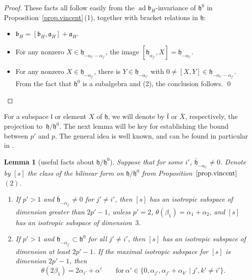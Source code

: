 \documentclass[pdftex]{sigma}
\numberwithin{equation}{section}
\newtheorem{lem}[thm]{Lemma}
\theoremstyle{definition}
\newcommand{\lieh}{\mathfrak{h}}
\def\a{{\mathfrak a}}
\def\b{{\mathfrak b}}
\newcommand{\ad}{\operatorname{ad}}
\begin{document}
\begin{proof}
These facts all follow easily from the $\ad \b_H$-invariance of $\lieh^0$ in Proposition~\ref{prop.vincent}\,(1), together with bracket relations in $\lieh$:
\begin{itemize}\itemsep=0pt
\item[(1)] $\b_H = [\b_H, \a_H] + \a_H$.
\item[(2)] For any nonzero $X \in \lieh_{- \alpha_{i'} - \alpha_{j'}}$, the image $[\lieh_{\alpha_{j'}},X] = \lieh_{-\alpha_{i'}}$.
\item[(3)] For any nonzero $X \in \lieh_{-\alpha_{j'}}$, there is $Y \in \lieh_{- \alpha_{i'}}$ with $0 \neq [X,Y] \in \lieh_{- \alpha_{i'}-\alpha_{j'}}$. From the fact that $\lieh^0$ is a subalgebra and (2), the conclusion follows.
\hfill\qed
\end{itemize}
\renewcommand{\qed}{}
\end{proof}

For a subspace $\mathfrak{l}$ or element $X$ of $\lieh$, we will denote by $\bar{\mathfrak{l}}$ or $\bar{X}$, respectively, the projection to~$\lieh/\lieh^0$.
The next lemma will be key for establishing the bound between $p'$ and $p$. The general idea is well known, and can be found in particular in \cite{pecastaing.rank1}.



\begin{lem}[useful facts about $\lieh/\lieh^0$]
\label{lem.h.mod.h0}
Suppose that for some $i'$, $\bar{\lieh}_{- \alpha_{i'}} \neq 0$. Denote by $[s]$ the class of the bilinear form on $\lieh/\lieh^0$ from Proposition~$\ref{prop.vincent}$\,$(2)$.
\begin{enumerate}\itemsep=0pt
\item[$(1)$] If $p' >1$ and $\bar{\lieh}_{- \alpha_{j'}} \neq 0$ for $j' \neq i'$, then $[s]$ has an isotropic subspace of dimension greater than $2p' - 1$, unless $p'=2$, $\theta(\beta_1) = \alpha_1 + \alpha_2$, and $[s]$ has an isotropic subspace of dimension~$3$.
\item[$(2)$] If $p' > 1$ and $\lieh_{- \alpha_{j'}} \subset \lieh^0$ for all $j' \neq i'$, then $[s]$ has an isotropic subspace of dimension at least $2p'-1$. If the maximal isotropic subspace for $[s]$ is dimension $2 p' - 1$, then
 \[\theta(2 \beta_1) = 2 \alpha_{i'} + \alpha'\qquad \mbox{for} \ \alpha' \in \{ 0, \alpha_{j'}, \alpha_{j'} + \alpha_{k'} \mid j', k' \neq i' \}.\]
\end{enumerate}
\end{lem}
\end{document}

